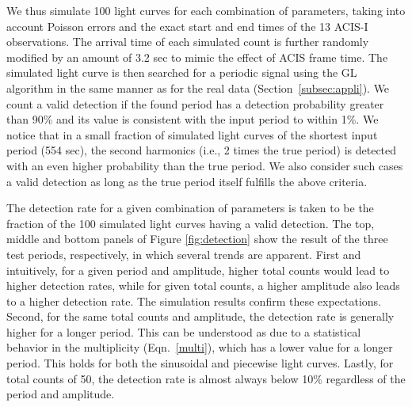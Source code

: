 \documentclass[fleqn,usenatbib]{mnras}
\begin{document}
We thus simulate 100 light curves for each combination of parameters, taking into account Poisson errors and the exact start and end times of the 13 ACIS-I observations. The arrival time of each simulated count is further randomly modified by an amount of 3.2 sec to mimic the effect of ACIS frame time.
The simulated light curve is then searched for a periodic signal using the GL algorithm in the same manner as for the real data (Section~\ref{subsec:appli}).
We count a valid detection if the found period has a detection probability greater than 90\% and its value is consistent with the input period to within 1\%. 
We notice that in a small fraction of simulated light curves of the shortest input period (554 sec), the second harmonics (i.e., 2 times the true period) is detected with an even higher probability than the true period. We also consider such cases a valid detection as long as the true period itself fulfills the above criteria.

The detection rate for a given combination of parameters is taken to be the fraction of the 100 simulated light curves having a valid detection. The top, middle and bottom panels of Figure \ref{fig:detection} show the result of the three test periods, respectively, in which several trends are apparent. 
First and intuitively, for a given period and amplitude, higher total counts would lead to higher detection rates, while for given total counts, a higher amplitude also leads to a higher detection rate. The simulation results confirm these expectations.  
Second, for the same total counts and amplitude, the detection rate is generally higher for a longer period.  
This can be understood as due to a statistical behavior in the 
multiplicity (Eqn.~\ref{multi}), which has a lower value for a longer period. This holds for both the sinusoidal and piecewise light curves. 
Lastly, for total counts of 50, the detection rate is almost always below 10\% regardless of the period and amplitude. 
 
\end{document}
